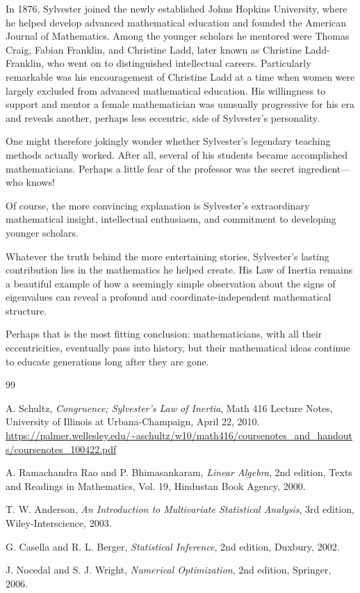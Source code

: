 \documentclass[11pt]{article}
\theoremstyle{definition}
\theoremstyle{remark}
\begin{document}
In 1876, Sylvester joined the newly established
Johns Hopkins University, where he helped
develop advanced mathematical education
and founded the American Journal of Mathematics.
Among the younger scholars he mentored
were Thomas Craig, Fabian Franklin, and
Christine Ladd, later known as Christine
Ladd-Franklin, who went on to distinguished
intellectual careers. Particularly remarkable
was his encouragement of Christine Ladd at
a time when women were largely excluded from
advanced mathematical education. His willingness
to support and mentor a female mathematician
was unusually progressive for his era and
reveals another, perhaps less eccentric,
side of Sylvester's personality.

One might therefore jokingly wonder whether
Sylvester's legendary teaching methods
actually worked. After all, several of his
students became accomplished mathematicians.
Perhaps a little fear of the professor was
the secret ingredient---who knows!

Of course, the more convincing explanation
is Sylvester's extraordinary mathematical
insight, intellectual enthusiasm, and
commitment to developing younger scholars.

Whatever the truth behind the more entertaining
stories, Sylvester's lasting contribution
lies in the mathematics he helped create.
His Law of Inertia remains a beautiful example
of how a seemingly simple observation about
the signs of eigenvalues can reveal a profound
and coordinate-independent mathematical
structure.

Perhaps that is the most fitting conclusion:
mathematicians, with all their eccentricities,
eventually pass into history, but their
mathematical ideas continue to educate
generations long after they are gone.


\begin{thebibliography}{99}

A. Schultz,
\emph{Congruence; Sylvester's Law of Inertia},
Math 416 Lecture Notes,
University of Illinois at Urbana-Champaign,
April 22, 2010.
\url{https://palmer.wellesley.edu/~aschultz/w10/math416/coursenotes_and_handouts/coursenotes_100422.pdf}

A. Ramachandra Rao and P. Bhimasankaram,
\emph{Linear Algebra},
2nd edition,
Texts and Readings in Mathematics, Vol. 19,
Hindustan Book Agency, 2000.

T. W. Anderson,
\emph{An Introduction to Multivariate Statistical Analysis},
3rd edition,
Wiley-Interscience, 2003.

G. Casella and R. L. Berger,
\emph{Statistical Inference},
2nd edition,
Duxbury, 2002.

J. Nocedal and S. J. Wright,
\emph{Numerical Optimization},
2nd edition,
Springer, 2006.


\end{thebibliography}
\end{document}
